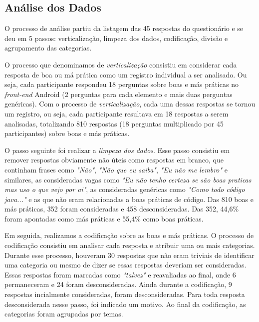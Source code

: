 \subsection{An\'alise dos Dados}
\label{sub:smells-definition}

O processo de an\'alise partiu da listagem das 45 respostas do question\'ario e se deu em 5 passos: verticaliza\c{c}\~ao, limpeza dos dados, codifica\c{c}\~ao, divis\~ao e agrupamento das categorias. 

O processo que denominamos de \textit{verticaliza\c{c}\~ao} consistiu em considerar cada resposta de boa ou m\'a pr\'atica como um registro individual a ser analisado. Ou seja, cada participante respondeu 18 perguntas sobre boas e m\'as pr\'aticas no \textit{front-end} Android (2 perguntas para cada elemento e mais duas perguntas gen\'ericas). Com o processo de \textit{verticaliza\c{c}\~ao}, cada uma dessas respostas se tornou um registro, ou seja, cada participante resultava em 18 respostas a serem analisadas, totalizando 810 respostas (18 perguntas multiplicado por 45 participantes) sobre boas e m\'as pr\'aticas.

O passo seguinte foi realizar a \textit{limpeza dos dados}. Esse passo consistiu em remover respostas obviamente n\~ao \'uteis como respostas em branco, que continham frases como \textit{"N\~ao"}, \textit{"N\~ao que eu saiba"}, \textit{"Eu n\~ao me lembro"} e similares, as consideradas vagas como \textit{"Eu n\~ao tenho certeza se s\~ao boas praticas mas uso o que vejo por ai"}, as consideradas gen\'ericas como \textit{"Como todo c\'odigo java..."} e as que n\~ao eram relacionadas a boas pr\'aticas de c\'odigo. Das 810 boas e m\'as pr\'aticas, 352 foram consideradas e 458 desconsideradas. Das 352, 44,6\% foram apontadas como m\'as pr\'aticas e 55,4\% como boas pr\'aticas. 


Em seguida, realizamos a codifica\c{c}\~ao sobre as boas e m\'as pr\'aticas. O processo de codifica\c{c}\~ao consistiu em analisar cada resposta e atribuir uma ou mais categorias. Durante esse processo, houveram 30 respostas que n\~ao eram triviais de identificar uma categoria ou mesmo de dizer se essas respostas deveriam ser consideradas. Essas respostas foram marcadas como \textit{"talvez"} e reavaliadas ao final, onde 6 permaneceram e 24 foram desconsideradas. Ainda durante a codifica\c{c}\~ao, 9 respostas incialmente consideradas, foram desconsideradas. Para toda resposta desconsiderada nesse passo, foi indicado um motivo. Ao final da codifica\c{c}\~ao, as categorias foram agrupadas por temas.

